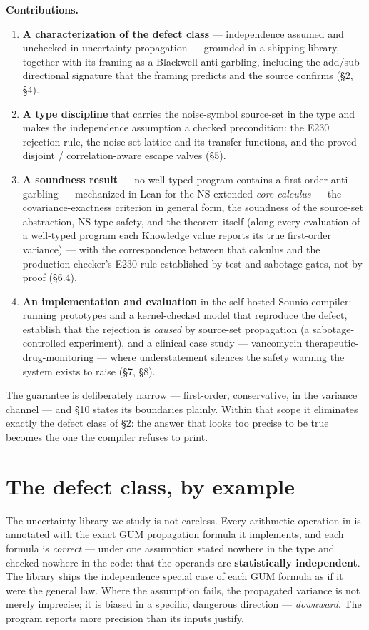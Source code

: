 \documentclass[sigplan,review,anonymous,10pt]{acmart}
\begin{document}
\textbf{Contributions.}

\begin{enumerate}
  \item \textbf{A characterization of the defect class} --- independence assumed and unchecked in uncertainty propagation --- grounded in a shipping library, together with its framing as a Blackwell anti-garbling, including the add/sub directional signature that the framing predicts and the source confirms (§2, §4).
  \item \textbf{A type discipline} that carries the noise-symbol source-set in the type and makes the independence assumption a checked precondition: the E230 rejection rule, the noise-set lattice and its transfer functions, and the proved-disjoint / correlation-aware escape valves (§5).
  \item \textbf{A soundness result} --- no well-typed program contains a first-order anti-garbling --- mechanized in Lean for the NS-extended \emph{core calculus} --- the covariance-exactness criterion in general form, the soundness of the source-set abstraction, NS type safety, and the theorem itself (along every evaluation of a well-typed program each Knowledge value reports its true first-order variance) --- with the correspondence between that calculus and the production checker's E230 rule established by test and sabotage gates, not by proof (§6.4).
  \item \textbf{An implementation and evaluation} in the self-hosted Sounio compiler: running prototypes and a kernel-checked model that reproduce the defect, establish that the rejection is \emph{caused} by source-set propagation (a sabotage-controlled experiment), and a clinical case study --- vancomycin therapeutic-drug-monitoring --- where understatement silences the safety warning the system exists to raise (§7, §8).
\end{enumerate}

The guarantee is deliberately narrow --- first-order, conservative, in the variance channel --- and §10 states its boundaries plainly. Within that scope it eliminates exactly the defect class of §2: the answer that looks too precise to be true becomes the one the compiler refuses to print.

\section{The defect class, by example}

The uncertainty library we study is not careless. Every arithmetic operation in  is annotated with the exact GUM propagation formula it implements, and each formula is \emph{correct} --- under one assumption stated nowhere in the type and checked nowhere in the code: that the operands are \textbf{statistically independent}. The library ships the independence special case of each GUM formula as if it were the general law. Where the assumption fails, the propagated variance is not merely imprecise; it is biased in a specific, dangerous direction --- \emph{downward}. The program reports more precision than its inputs justify.
\end{document}

